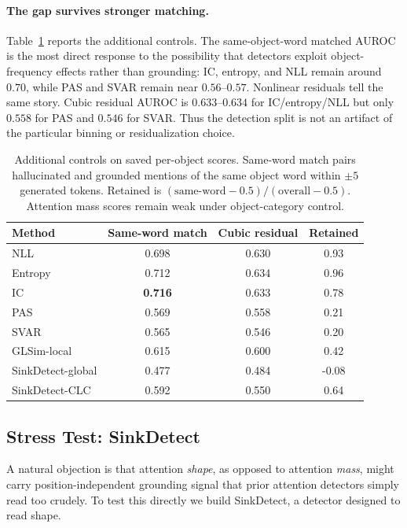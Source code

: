\documentclass[letterpaper]{article} \usepackage[submission]{aaai2027}  \usepackage[hyphens]{url}  \usepackage{graphicx} \urlstyle{rm} \def\UrlFont{\rm}  \usepackage{natbib}  \usepackage{caption} \frenchspacing
\begin{document}
\paragraph{The gap survives stronger matching.} Table~\ref{tab:strong-controls} reports the additional controls. The same-object-word matched AUROC is the most direct response to the possibility that detectors exploit object-frequency effects rather than grounding: IC, entropy, and NLL remain around $0.70$, while PAS and SVAR remain near $0.56$--$0.57$. Nonlinear residuals tell the same story. Cubic residual AUROC is $0.633$--$0.634$ for IC/entropy/NLL but only $0.558$ for PAS and $0.546$ for SVAR. Thus the detection split is not an artifact of the particular binning or residualization choice.

\begin{table}[t]
\centering
\scriptsize
\setlength{\tabcolsep}{3.0pt}
\begin{tabular}{lccc}
\toprule
Method & Same-word match & Cubic residual & Retained \\
\midrule
NLL & 0.698 & 0.630 & 0.93 \\
Entropy & 0.712 & 0.634 & 0.96 \\
IC & \textbf{0.716} & 0.633 & 0.78 \\
PAS & 0.569 & 0.558 & 0.21 \\
SVAR & 0.565 & 0.546 & 0.20 \\
GLSim-local & 0.615 & 0.600 & 0.42 \\
SinkDetect-global & 0.477 & 0.484 & -0.08 \\
SinkDetect-CLC & 0.592 & 0.550 & 0.64 \\
\bottomrule
\end{tabular}
\caption{Additional controls on saved per-object scores. Same-word match pairs hallucinated and grounded mentions of the same object word within $\pm5$ generated tokens. Retained is $(\mathrm{same\mbox{-}word}-0.5)/(\mathrm{overall}-0.5)$. Attention mass scores remain weak under object-category control.}
\label{tab:strong-controls}
\end{table}
 

\subsection{Stress Test: SinkDetect}
\label{sec:sinkdetect}

A natural objection is that attention \emph{shape}, as opposed to attention \emph{mass}, might carry position-independent grounding signal that prior attention detectors simply read too crudely. To test this directly we build SinkDetect, a detector designed to read shape.
\end{document}
